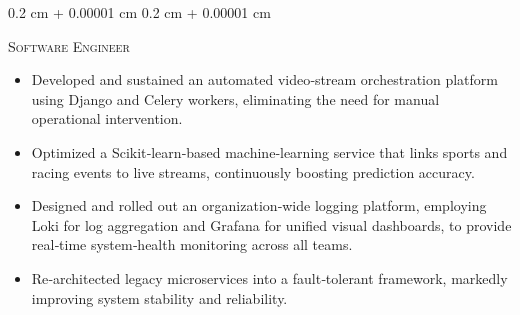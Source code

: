 \documentclass[10pt, letterpaper]{article}
\newcommand\textscc[1]{\textcolor{sourceColor}{\textsc{#1}}}
\newenvironment{highlights}{
    \begin{itemize}[
        topsep=0.10 cm,
        parsep=0.10 cm,
        partopsep=0pt,
        itemsep=0pt,
        leftmargin=0.4 cm + 10pt
    ]
}{
    \end{itemize}
} %
\newenvironment{onecolentry}{
    \begin{adjustwidth}{
        0.2 cm + 0.00001 cm
    }{
        0.2 cm + 0.00001 cm
    }
}{
    \end{adjustwidth}
} %
\begin{document}
        \begin{onecolentry}
            \textscc{Software Engineer} \begin{highlights}
                \item Developed and sustained an automated video‑stream orchestration platform using Django and Celery workers, eliminating the need for manual operational intervention.
                \item Optimized a Scikit‑learn‑based machine‑learning service that links sports and racing events to live streams, continuously boosting prediction accuracy.
                \item Designed and rolled out an organization‑wide logging platform, employing Loki for log aggregation and Grafana for unified visual dashboards, to provide real‑time system‑health monitoring across all teams.
                \item Re‑architected legacy microservices into a fault‑tolerant framework, markedly improving system stability and reliability.
            \end{highlights}
            
        \end{onecolentry}
\end{document}
